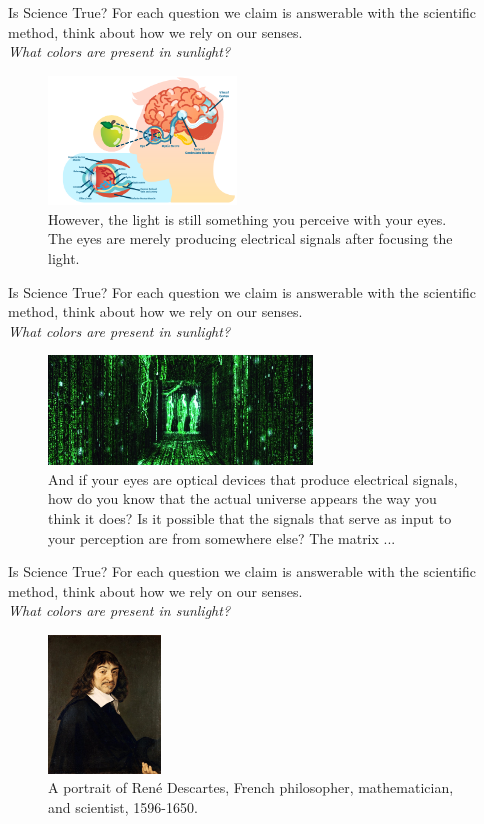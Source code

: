 \documentclass{beamer}
\begin{document}
\begin{frame}{Is Science True?}
For each question we claim is answerable with the scientific method, think about how we rely on our senses. \\ \vspace{0.5cm}
\textit{What colors are present in sunlight?}
\begin{figure}
\centering
\includegraphics[width=5cm]{figures/eye.png}
\caption{However, the light is still something you perceive with your eyes.  The eyes are merely producing electrical signals after focusing the light.}
\end{figure}
\end{frame}

\begin{frame}{Is Science True?}
For each question we claim is answerable with the scientific method, think about how we rely on our senses. \\ \vspace{0.5cm}
\textit{What colors are present in sunlight?}
\begin{figure}
\centering
\includegraphics[width=7cm]{figures/matrix.jpg}
\caption{And if your eyes are optical devices that produce electrical signals, how do you know that the actual universe appears the way you think it does?  Is it possible that the signals that serve as input to your perception are from somewhere else? The matrix ...}
\end{figure}
\end{frame}

\begin{frame}{Is Science True?}
For each question we claim is answerable with the scientific method, think about how we rely on our senses. \\ \vspace{0.5cm}
\textit{What colors are present in sunlight?}
\begin{figure}
\centering
\includegraphics[width=3cm]{figures/rene.jpg}
\caption{A portrait of Ren\'{e} Descartes, French philosopher, mathematician, and scientist, 1596-1650.}
\end{figure}
\end{frame}
\end{document}
